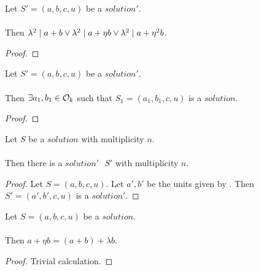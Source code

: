 \begin{lemma}
    \label{lmm:lambda_sq_dvd_or_dvd_or_dvd}
    \leanok
    Let $S'=(a, b, c, u)$ be a $solution'$.\\\\
    Then $\lambda^2 \mid a + b \lor \lambda^2 \mid a +
    \eta  b \lor \lambda^2 \mid a + \eta^2  b$.
\end{lemma}
\begin{proof}
    \leanok
\end{proof}

\begin{lemma}
    \label{lmm:ex_dvd_a_add_b}
    \leanok
    Let $S'=(a, b, c, u)$ be a $solution'$.\\\\
    Then $\exists a_1,b_1 \in \mathcal{O}_k$ such that $S_1=(a_1,b_1,c,u)$ is a $solution$.
\end{lemma}
\begin{proof}
    \leanok
\end{proof}

\begin{lemma}
    \label{lmm:exists_Solution_of_Solution1}
    \leanok
    Let $S$ be a $solution$ with multiplicity $n$.\\\\
    Then there is a $solution'\text{ }S'$ with multiplicity $n$.
\end{lemma}
\begin{proof}
    \leanok
    Let $S=(a,b,c,u)$. Let $a', b'$ be the units given by .
    Then $S'=(a',b',c,u)$ is a $solution'$.
\end{proof}

\begin{lemma}
    \label{lmm:a_add_eta_b}
    \leanok
    Let $S=(a, b, c, u)$ be a $solution$.\\\\
    Then $a + \eta  b = (a + b) + \lambda  b$.
\end{lemma}
\begin{proof}
    \leanok
    Trivial calculation.
\end{proof}

